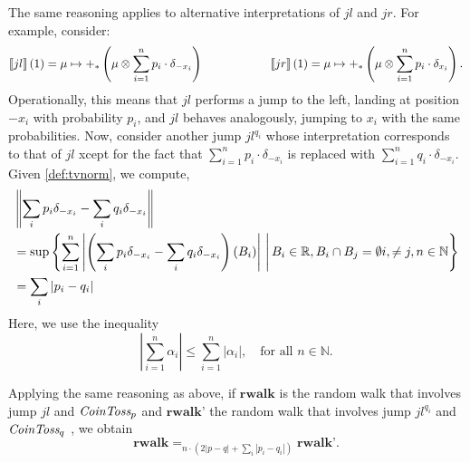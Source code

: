 \begin{example}
  
The same reasoning applies to alternative interpretations of $jl$ and $jr$. For example, consider:
\[
                        \left \llbracket jl \right \rrbracket(1)= \mu \mapsto +_\ast \left(\mu \otimes \sum_{i=1}^n  p_i\cdot  \delta_{-x_i}\right)
                        \hspace{2cm}
                        \left \llbracket jr \right \rrbracket(1) =\mu \mapsto +_\ast \left(\mu \otimes \sum_{i=1}^n p_i\cdot \delta_{x_i}\right).
        \]
Operationally, this means that $jl$ performs a jump to the left, landing at position $-x_i$ with probability $p_i$, and $jl$ behaves analogously, jumping to $x_i$ with the same probabilities. Now, consider another jump $jl^{q_i}$ whose interpretation corresponds to that of $jl$ xcept for the fact that $\sum_{i=1}^n p_i\cdot \delta_{-x_i}$ is replaced with $ \sum_{i=1}^n  q_i\cdot \delta_{-x_i}$.
Given \autoref{def:tvnorm}, we compute,
    \begin{align*}
      &\left\lVert  \sum_i p_i \delta_{-x_i} - \sum_i q_i \delta_{-x_i} \right\rVert  \\
      & = \sup \left\{ \sum_{i=1}^{n} \left\lvert \left(\sum_i p_i \delta_{-x_i} - \sum_i q_i \delta_{-x_i} \right) (B_i) \right\rvert \,\Bigg| \, B_i \in \mathbb{R}, B_i \cap B_j = \emptyset i,  \neq j, n \in \mathbb{N}  \right\} \\
      & = \sum_i |p_i-q_i|
    \end{align*}
    Here, we use the inequality
\[
\left| \sum_{i=1}^{n} \alpha_i \right| \leq \sum_{i=1}^{n} |\alpha_i|, \quad \text{for all } n \in \mathbb{N}.
\]

Applying the same reasoning as above, if $\textbf{rwalk}$ is the random walk that involves jump $jl$ and $ \emph{CoinToss}_p$  and $\textbf{rwalk'}$ the random walk that involves jump $jl^{q_i}$ and $ \emph{CoinToss}_q$ , we obtain 
 \[
                \textbf{rwalk} =_{n \cdot \left(2 |p-q|+ \sum_i |p_i-q_i|\right)}
                \textbf{rwalk'}. 
        \]


        
\end{example}